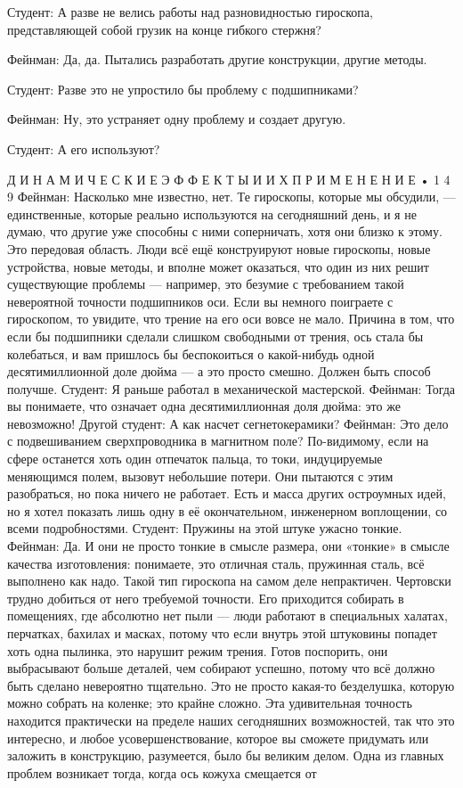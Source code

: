 \documentclass[10pt,oneside]{article}
\begin{document}
Студент: А разве не велись работы над разновидностью гироскопа, представляющей собой грузик на конце гибкого стержня?\par

Фейнман: Да, да. Пытались разработать другие конструкции, другие методы.\par

Студент: Разве это не упростило бы проблему с подшипниками?\par

Фейнман: Ну, это устраняет одну проблему и создает другую.\par

Студент: А его используют?\par

Д И Н А М И Ч Е С К И Е  Э Ф Ф Е К Т Ы  И  И Х  П Р И М Е Н Е Н И Е • 1 4 9 Фейнман: Насколько мне известно, нет. Те гироскопы, которые мы обсудили, --- единственные, которые реально используются на сегодняшний день, и я не думаю, что другие уже способны с ними соперничать, хотя они близко к этому. Это передовая область. Люди всё ещё конструируют новые гироскопы, новые устройства, новые методы, и вполне может оказаться, что один из них решит существующие проблемы --- например, это безумие с требованием такой невероятной точности подшипников оси. Если вы немного поиграете с гироскопом, то увидите, что трение на его оси вовсе не мало. Причина в том, что если бы подшипники сделали слишком свободными от трения, ось стала бы колебаться, и вам пришлось бы беспокоиться о какой-нибудь одной десятимиллионной доле дюйма --- а это просто смешно. Должен быть способ получше. Студент: Я раньше работал в механической мастерской. Фейнман: Тогда вы понимаете, что означает одна десятимиллионная доля дюйма: это же невозможно! Другой студент: А как насчет сегнетокерамики? Фейнман: Это дело с подвешиванием сверхпроводника в магнитном поле? По-видимому, если на сфере останется хоть один отпечаток пальца, то токи, индуцируемые меняющимся полем, вызовут небольшие потери. Они пытаются с этим разобраться, но пока ничего не работает. Есть и масса других остроумных идей, но я хотел показать лишь одну в её окончательном, инженерном воплощении, со всеми подробностями. Студент: Пружины на этой штуке ужасно тонкие. Фейнман: Да. И они не просто тонкие в смысле размера, они «тонкие» в смысле качества изготовления: понимаете, это отличная сталь, пружинная сталь, всё выполнено как надо. Такой тип гироскопа на самом деле непрактичен. Чертовски трудно добиться от него требуемой точности. Его приходится собирать в помещениях, где абсолютно нет пыли --- люди работают в специальных халатах, перчатках, бахилах и масках, потому что если внутрь этой штуковины попадет хоть одна пылинка, это нарушит режим трения. Готов поспорить, они выбрасывают больше деталей, чем собирают успешно, потому что всё должно быть сделано невероятно тщательно. Это не просто какая-то безделушка, которую можно собрать на коленке; это крайне сложно. Эта удивительная точность находится практически на пределе наших сегодняшних возможностей, так что это интересно, и любое усовершенствование, которое вы сможете придумать или заложить в конструкцию, разумеется, было бы великим делом. Одна из главных проблем возникает тогда, когда ось кожуха смещается от 
\end{document}
